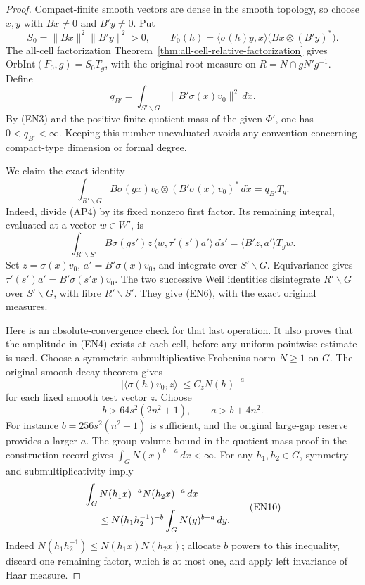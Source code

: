 \begin{proof}
Compact-finite smooth vectors are dense in the smooth
topology, so choose \(x,y\) with \(Bx\ne0\) and
\(B'y\ne0\). Put
\[
 S_0=\|Bx\|^2\|B'y\|^2>0,\qquad
 F_0(h)=\langle\sigma(h)y,x\rangle
                   \bigl(Bx\otimes(B'y)^*\bigr).
\]
The all-cell factorization
Theorem~\ref{thm:all-cell-relative-factorization} gives
\(\mathrm{OrbInt}(F_0,g)=S_0T_g\), with the original
root measure on \(R=N\cap gN'g^{-1}\). Define
\[
 q_{B'}=\int_{S'\backslash G}
                \|B'\sigma(x)v_0\|^2\,d\dot x .
                                                        \tag{EN5}
\]
By (EN3) and the positive finite quotient mass of the
given \(\Phi'\), one has \(0<q_{B'}<\infty\). Keeping this
number unevaluated avoids any convention concerning
compact-type dimension or formal degree.

We claim the exact identity
\[
 \int_{R'\backslash G}
       B\sigma(gx)v_0\otimes(B'\sigma(x)v_0)^*
                         \,d\dot x=q_{B'}T_g .
                                                        \tag{EN6}
\]
Indeed, divide (AP4) by its fixed nonzero first factor.
Its remaining integral, evaluated at a vector \(w\in W'\),
is
\[
 \int_{R'\backslash S'}
 B\sigma(gs')z\,\langle w,\tau'(s')a'\rangle\,d\dot s'
           =\langle B'z,a'\rangle T_gw .
                                                        \tag{EN7}
\]
Set \(z=\sigma(x)v_0\), \(a'=B'\sigma(x)v_0\), and
integrate over \(S'\backslash G\). Equivariance gives
\(\tau'(s')a'=B'\sigma(s'x)v_0\). The two successive
Weil identities disintegrate \(R'\backslash G\) over
\(S'\backslash G\), with fibre \(R'\backslash S'\).
They give (EN6), with the exact original measures.

Here is an absolute-convergence check for that last
operation. It also proves that the amplitude in (EN4)
exists at each cell, before any uniform pointwise
estimate is used. Choose a symmetric submultiplicative
Frobenius norm \(N\ge1\) on \(G\). The original
smooth-decay theorem gives
\[
 |\langle\sigma(h)v_0,z\rangle|
                  \le C_zN(h)^{-a}
                                                        \tag{EN8}
\]
for each fixed smooth test vector \(z\). Choose
\[
 b>64s^2(2n^2+1),\qquad a>b+4n^2.
                                                        \tag{EN9}
\]
For instance \(b=256s^2(n^2+1)\) is sufficient, and
the original large-gap reserve provides a larger \(a\).
The group-volume bound in
the quotient-mass proof in the construction record gives
\(\int_G N(x)^{b-a}\,dx<\infty\).
For any \(h_1,h_2\in G\), symmetry and
submultiplicativity imply
\[
 \begin{split}
 &\int_GN(h_1x)^{-a}N(h_2x)^{-a}\,dx\\
 &\hspace{5mm}\le
 N(h_1h_2^{-1})^{-b}
                 \int_GN(y)^{b-a}\,dy .
 \end{split}                                           \tag{EN10}
\]
Indeed \(N(h_1h_2^{-1})\le N(h_1x)N(h_2x)\);
allocate \(b\) powers to this inequality, discard
one remaining factor, which is at most one, and
apply left invariance of Haar measure.


\end{proof}
